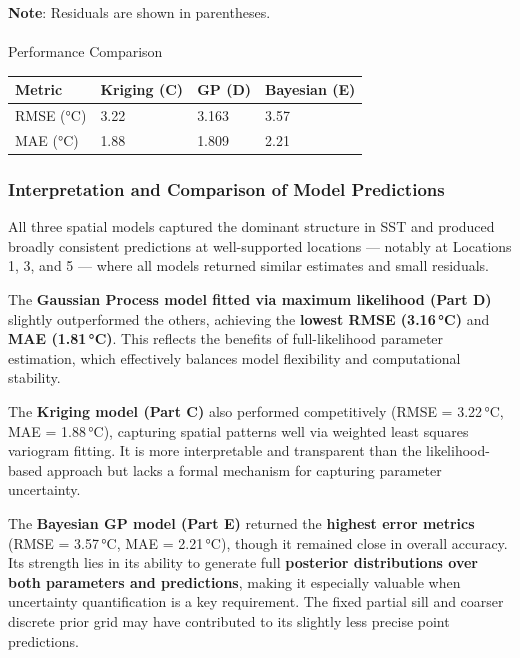 \documentclass[
  11pt,
]{article}
\makeatletter
\let\oldparagraph\paragraph
\renewcommand{\paragraph}{
    \@ifstar
      \xxxParagraphStar
      \xxxParagraphNoStar
  }
\newcommand{\xxxParagraphStar}[1]{\oldparagraph*{#1}\mbox{}}
\newcommand{\xxxParagraphNoStar}[1]{\oldparagraph{#1}\mbox{}}
\makeatother
\begin{document}
\textbf{Note}: Residuals are shown in parentheses.

\paragraph{Performance Comparison}\label{performance-comparison}

\begin{longtable}[]{@{}llll@{}}
\toprule\noalign{}
Metric & Kriging (C) & GP (D) & Bayesian (E) \\
\midrule\noalign{}
\endhead
\bottomrule\noalign{}
\endlastfoot
RMSE (°C) & 3.22 & 3.163 & 3.57 \\
MAE (°C) & 1.88 & 1.809 & 2.21 \\
\end{longtable}

\subsubsection{\texorpdfstring{\textbf{Interpretation and Comparison of
Model
Predictions}}{Interpretation and Comparison of Model Predictions}}\label{interpretation-and-comparison-of-model-predictions}

All three spatial models captured the dominant structure in SST and
produced broadly consistent predictions at well-supported locations ---
notably at Locations 1, 3, and 5 --- where all models returned similar
estimates and small residuals.

The \textbf{Gaussian Process model fitted via maximum likelihood (Part
D)} slightly outperformed the others, achieving the \textbf{lowest RMSE
(3.16\,°C)} and \textbf{MAE (1.81\,°C)}. This reflects the benefits of
full-likelihood parameter estimation, which effectively balances model
flexibility and computational stability.

The \textbf{Kriging model (Part C)} also performed competitively (RMSE =
3.22\,°C, MAE = 1.88\,°C), capturing spatial patterns well via weighted
least squares variogram fitting. It is more interpretable and
transparent than the likelihood-based approach but lacks a formal
mechanism for capturing parameter uncertainty.

The \textbf{Bayesian GP model (Part E)} returned the \textbf{highest
error metrics} (RMSE = 3.57\,°C, MAE = 2.21\,°C), though it remained
close in overall accuracy. Its strength lies in its ability to generate
full \textbf{posterior distributions over both parameters and
predictions}, making it especially valuable when uncertainty
quantification is a key requirement. The fixed partial sill and coarser
discrete prior grid may have contributed to its slightly less precise
point predictions.
\end{document}
